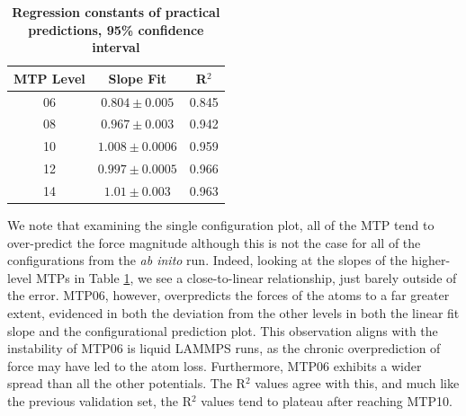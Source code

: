 \documentclass[9pt,twocolumn,twoside]{opticajnl}
\begin{document}
\begin{table}[htbp]
  \centering
  \caption{\bf Regression constants of practical predictions, 95\% confidence interval }
  \begin{tabular}{ccc}
  \hline
  MTP Level & Slope Fit &  R$^2$\\ 
  \hline
  06 & $0.804 \pm 0.005$ & 0.845 \\
  08 & $0.967 \pm 0.003$ & 0.942  \\
  10 & $1.008 \pm 0.0006$ & 0.959 \\
  12 & $0.997 \pm 0.0005$ & 0.966 \\
  14 & $1.01 \pm 0.003$ & 0.963 \\
  \hline
  \end{tabular}
  \label{tab:aimdconfigs}
\end{table}

We note that examining the single configuration plot, all of the MTP tend to over-predict the force magnitude although this is not the case for all of the configurations from the \textit{ab inito} run. Indeed, looking at the slopes of the higher-level MTPs in Table \ref{tab:aimdconfigs}, we see a close-to-linear relationship, just barely outside of the error.  MTP06, however, overpredicts the forces of the atoms to a far greater extent, evidenced in both the deviation from the other levels in both the linear fit slope and the configurational prediction plot. This observation aligns with the instability of MTP06 is liquid LAMMPS runs, as the chronic overprediction of force may have led to the atom loss. Furthermore, MTP06 exhibits a wider spread than all the other potentials. The R$^2$ values agree with this, and much like the previous validation set, the R$^2$ values tend to plateau after reaching MTP10.
\end{document}
